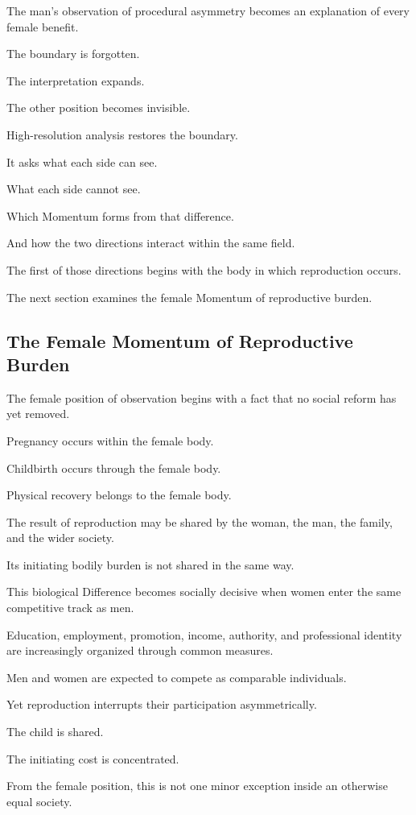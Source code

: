 The man’s observation of procedural asymmetry becomes an explanation of every female benefit.

The boundary is forgotten.

The interpretation expands.

The other position becomes invisible.

High-resolution analysis restores the boundary.

It asks what each side can see.

What each side cannot see.

Which Momentum forms from that difference.

And how the two directions interact within the same field.

The first of those directions begins with the body in which reproduction occurs.

The next section examines the female Momentum of reproductive burden.

\subsection*{\textbf{The Female Momentum of Reproductive Burden}}

The female position of observation begins with a fact that no social reform has yet removed.

Pregnancy occurs within the female body.

Childbirth occurs through the female body.

Physical recovery belongs to the female body.

The result of reproduction may be shared by the woman, the man, the family, and the wider society.

Its initiating bodily burden is not shared in the same way.

This biological Difference becomes socially decisive when women enter the same competitive track as men.

Education, employment, promotion, income, authority, and professional identity are increasingly organized through common measures.

Men and women are expected to compete as comparable individuals.

Yet reproduction interrupts their participation asymmetrically.

The child is shared.

The initiating cost is concentrated.

From the female position, this is not one minor exception inside an otherwise equal society.

